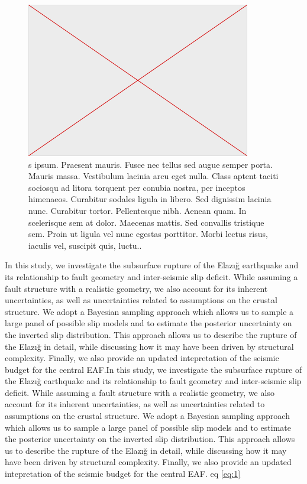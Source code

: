 \documentclass[breakmath]{seismica}
\begin{document}
	\begin{figure}
		\includegraphics[width=\textwidth]{empty2} 
		\caption{s ipsum. Praesent mauris. Fusce nec tellus sed augue semper porta. Mauris massa. Vestibulum lacinia arcu eget nulla. Class aptent taciti sociosqu ad litora torquent per conubia nostra, per inceptos himenaeos. Curabitur sodales ligula in libero. Sed dignissim lacinia nunc. Curabitur tortor. Pellentesque nibh. Aenean quam. In scelerisque sem at dolor. Maecenas mattis. Sed convallis tristique sem. Proin ut ligula vel nunc egestas porttitor. Morbi lectus risus, iaculis vel, suscipit quis, luctu..}
		\label{bla}
	\end{figure}

In this study, we investigate the subsurface rupture of the Elaz{\i}\u{g} earthquake and its relationship to fault geometry and inter-seismic slip deficit. While assuming a fault structure with a realistic geometry, we also account for its inherent uncertainties, as well as uncertainties related to assumptions on the crustal structure. We adopt a Bayesian sampling approach which allows us to sample a large panel of possible slip models and to estimate the posterior uncertainty on the inverted slip distribution. This approach allows us to describe the rupture of the Elaz{\i}\u{g} in detail, while discussing how it may have been driven by structural complexity. Finally, we also provide an updated intepretation of the seismic budget for the central EAF.In this study, we investigate the subsurface rupture of the Elaz{\i}\u{g} earthquake and its relationship to fault geometry and inter-seismic slip deficit. While assuming a fault structure with a realistic geometry, we also account for its inherent uncertainties, as well as uncertainties related to assumptions on the crustal structure. We adopt a Bayesian sampling approach which allows us to sample a large panel of possible slip models and to estimate the posterior uncertainty on the inverted slip distribution. This approach allows us to describe the rupture of the Elaz{\i}\u{g} in detail, while discussing how it may have been driven by structural complexity. Finally, we also provide an updated intepretation of the seismic budget for the central EAF.  eq \ref{eq:1}
\end{document}
